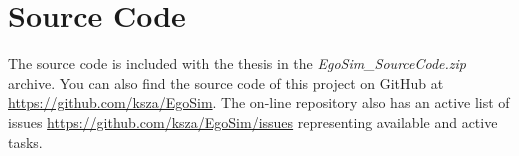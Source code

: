 \chapter{Source Code}\label{ch:source_code}
The source code is included with the thesis in the \emph{EgoSim\_SourceCode.zip} archive. You can also find the source code of this project on GitHub at \url{https://github.com/ksza/EgoSim}. The on-line repository also has an active list of issues \url{https://github.com/ksza/EgoSim/issues} representing available and active tasks.